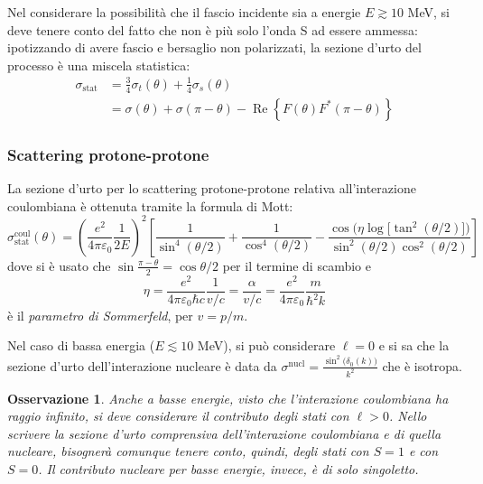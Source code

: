 \documentclass[11pt, a4paper]{scrartcl}
\theoremstyle{style}
\newtheorem{osservazione}{Osservazione}[section]
\numberwithin{equation}{subsection}
\begin{document}
Nel considerare la possibilit\`a che il fascio incidente sia a energie $E \gtrsim 10$ MeV, si deve tenere conto del fatto che non \`e pi\`u solo l'onda S ad essere ammessa: ipotizzando di avere fascio e bersaglio non polarizzati, la sezione d'urto del processo \`e una miscela statistica:
\[
	\begin{split}
		\sigma _\text{stat} &= \frac{3}{4} \sigma _t (\theta ) + \frac{1}{4} \sigma _s(\theta ) \\
				    & = \sigma (\theta ) + \sigma (\pi-\theta ) - \operatorname{Re} \left\{ F(\theta ) F^*(\pi-\theta ) \right\} 
	\end{split}
\] 

\subsubsection{Scattering protone-protone}

La sezione d'urto per lo scattering protone-protone relativa all'interazione coulombiana \`e ottenuta tramite la formula di Mott:
\[
\sigma _\text{stat}^\text{coul}(\theta ) = \left(\frac{e^2}{4\pi \varepsilon _0}\frac{1}{2E}\right) ^2 \left[ \frac{1}{\sin^4 (\theta  / 2)} + \frac{1}{\cos^4 (\theta  / 2)} - \frac{\cos \Big( \eta  \log\big[\tan^2 (\theta  / 2)\big] \Big) }{\sin^2 (\theta  / 2) \cos^2 (\theta  / 2)} \right] 
\] 
dove si \`e usato che $\sin \frac{\pi - \theta }{2} = \cos \theta  / 2$ per il termine di scambio e 
\[
\eta  = \frac{e^2}{4\pi \varepsilon _0 \hbar  c} \frac{1}{v / c} = \frac{\alpha}{v / c} = \frac{e^2}{4\pi \varepsilon _0}\frac{m}{\hbar ^2 k}
\] 
\`e il \textit{parametro di Sommerfeld}, per $v = p / m$.

Nel caso di bassa energia ($E\lesssim 10$ MeV), si pu\`o considerare $\ell  = 0$ e si sa che la sezione d'urto dell'interazione nucleare \`e data da $\sigma ^\text{nucl} = \frac{\sin^2\big( \delta _0(k)\big)}{k^2}$ che \`e isotropa.
\begin{osservazione}
Anche a basse energie, visto che l'interazione coulombiana ha raggio infinito, si deve considerare il contributo degli stati con $\ell > 0$.
Nello scrivere la sezione d'urto comprensiva dell'interazione coulombiana e di quella nucleare, bisogner\`a comunque tenere conto, quindi, degli stati con $S=1$ e con $S=0$.
Il contributo nucleare per basse energie, invece, \`e di solo singoletto.
\end{osservazione}
\end{document}
